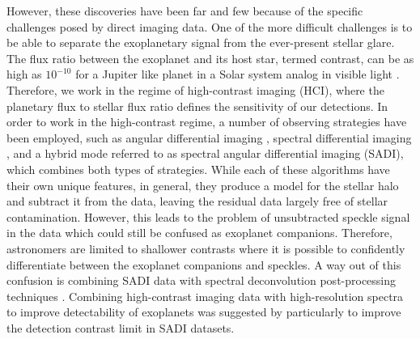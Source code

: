 \documentclass{aa}
\begin{document}
However, these discoveries have been far and few because of the specific challenges posed by direct imaging data.
One of the more difficult challenges is to be able to separate the exoplanetary signal from the ever-present stellar glare.
The flux ratio between the exoplanet and its host star, termed contrast, can be as high as $10^{-10}$ for a Jupiter like planet in a Solar system analog in visible light \citep[ for e.g][]{2023Galicher}.
Therefore, we work in the regime of high-contrast imaging (HCI), where the planetary flux to stellar flux ratio defines the sensitivity of our detections.
In order to work in the high-contrast regime, a number of observing strategies have been employed, such as angular differential imaging \citep[ADI, ][]{2006MaroisADI}, spectral differential imaging \citep[SDI, ][]{2002SparksSDI}, and a hybrid mode referred to as spectral angular differential imaging (SADI), which combines both types of strategies.
While each of these algorithms have their own unique features, in general, they produce a model for the stellar halo and subtract it from the data, leaving the residual data largely free of stellar contamination.
However, this leads to the problem of unsubtracted speckle signal in the data which could still be confused as exoplanet companions.
Therefore, astronomers are limited to shallower contrasts where it is possible to confidently differentiate between the exoplanet companions and speckles.
A way out of this confusion is combining SADI data with spectral deconvolution post-processing techniques \cite[e.g., ][]{2002SparksSDI, 2007ThatteSDI}.
Combining high-contrast imaging data with high-resolution spectra to improve detectability of exoplanets was suggested by \cite{2015Snellen} particularly to improve the detection contrast limit in SADI datasets.
\end{document}
